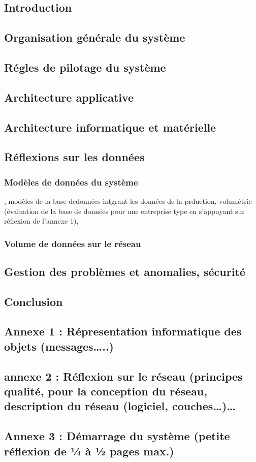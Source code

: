 \subsection{Introduction}

\subsection{Organisation générale du système}

\subsection{Régles de pilotage du système}

\subsection{Architecture applicative}

\subsection{Architecture informatique et matérielle}

\subsection{Réflexions sur les données }

\subsubsection{Modèles de données du système}
, modèles de la base dedonnées intgrant les données de la prduction, volumétrie (évaluation de la base de données
pour une entreprise type en s’appuyant sur réflexion de l’annexe 1),
\subsubsection{Volume de données sur le réseau}

\subsection{Gestion des problèmes et anomalies, sécurité}

\subsection{Conclusion}

\subsection{Annexe 1 : Répresentation informatique des objets (messages…..)}

\subsection{annexe 2 : Réflexion sur le réseau (principes qualité, pour la conception du réseau,
description du réseau (logiciel, couches…)…}

\subsection{Annexe 3 : Démarrage du système (petite réflexion de ¼ à ½ pages max.)}